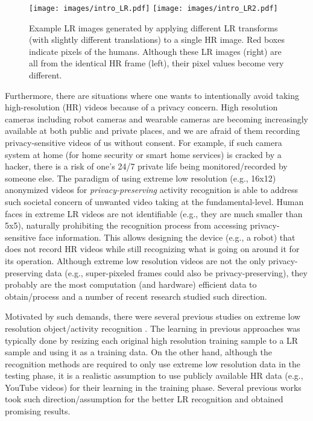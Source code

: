 \documentclass[letterpaper]{article} %
\begin{document}
\begin{figure}
\begin{center}
   \texttt{[image: images/intro\_LR.pdf]}
   \texttt{[image: images/intro\_LR2.pdf]}
\end{center}
   \caption{Example LR images generated by applying different LR transforms (with slightly different translations) to a single HR image. Red boxes indicate pixels of the humans. Although these LR images (right) are all from the identical HR frame (left), their pixel values become very different.}
\label{fig:intro}		
\end{figure}

Furthermore, there are situations where one wants to intentionally avoid taking high-resolution (HR) videos because of a privacy concern. High resolution cameras including robot cameras and wearable cameras are becoming increasingly available at both public and private places, and we are afraid of them recording privacy-sensitive videos of us without consent. For example, if such camera system at home (for home security or smart home services) is cracked by a hacker, there is a risk of one's 24/7 private life being monitored/recorded by someone else. The paradigm of using extreme low resolution (e.g., 16x12) anonymized videos for \emph{privacy-preserving} activity recognition is able to address such societal concern of unwanted video taking at the fundamental-level. Human faces in extreme LR videos are not identifiable (e.g., they are much smaller than 5x5), naturally prohibiting the recognition process from accessing privacy-sensitive face information. This allows designing the device (e.g., a robot) that does not record HR videos while still recognizing what is going on around it for its operation. Although extreme low resolution videos are not the only privacy-preserving data (e.g., super-pixeled frames could also be privacy-preserving), they probably are the most computation (and hardware) efficient data to obtain/process and a number of recent research \cite{dai15,ryoo17privacy} studied such direction.






















Motivated by such demands, there were several previous studies on extreme low resolution object/activity recognition \cite{dai15,lrface16,ryoo17privacy,chen17,cheng17emotion}. The learning in previous approaches was typically done by resizing each original high resolution training sample to a LR sample and using it as a training data. On the other hand, although the recognition methods are required to only use extreme low resolution data in the testing phase, it is a realistic assumption to use publicly available HR data (e.g., YouTube videos) for their learning in the training phase. Several previous works took such direction/assumption \cite{lrface16,ryoo17privacy,chen17,cheng17emotion} for the better LR recognition and obtained promising results.
\end{document}
